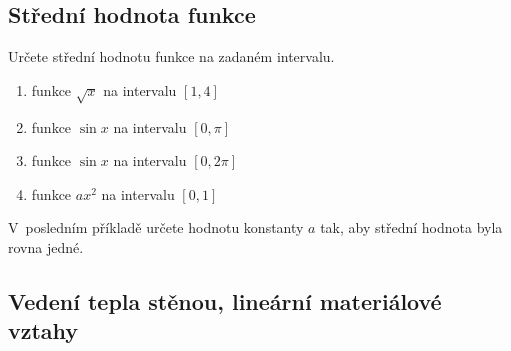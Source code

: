 
\stranka

\subsection{Střední hodnota funkce}
Určete střední hodnotu funkce na zadaném intervalu.

\begin{enumerate}[(1)]
\item funkce $\sqrt x$ na intervalu $[1,4]$
\item funkce $\sin x$ na intervalu $[0,\pi]$
\item funkce $\sin x$ na intervalu $[0,2\pi]$
\item funkce $ax^2$ na intervalu $[0,1]$
\end{enumerate}

V posledním příkladě určete hodnotu konstanty $a$ tak, aby střední hodnota byla rovna jedné.

\stranka
\subsection{Vedení tepla stěnou, lineární materiálové vztahy}

